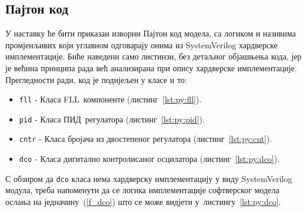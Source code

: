 \documentclass[master]{finthesis}
\newcommand*{\prog}[1]{\texttt{#1}}
\def \FLL  {FLL} %
\def \PID  {ПИД} %
\begin{document}
\subsection{Пајтон код} \label{section:python_model:source}
У наставку ће бити приказан изворни Пајтон код модела, са логиком и називима промјенљивих који углавном одговарају онима из SystemVerilog хардверске имплементације. Биће наведени само листинзи, без детаљног објашњења кода, јер је већина принципа рада већ анализирана при опису хардверске имплементације. Прегледности ради, код је подијељен у класе и то:
\begin{itemize}
	\item \prog{fll} - Класа \FLL\ компоненте (листинг~\ref{lst:py:fll}).
	\item \prog{pid} - Класа \PID\ регулатора (листинг~\ref{lst:py:pid}).
	\item \prog{cntr} - Класа бројача из двостепеног регулатора (листинг~\ref{lst:py:cnt}).
	\item \prog{dco} - Класа дигитално контролисаног осцилатора (листинг~\ref{lst:py:dco}).
\end{itemize}
С обзиром да \prog{dco} класа нема хардверску имплементацију у виду SystemVerilog модула, треба напоменути да се логика имплементације софтверског модела ослања на једначину~(\ref{f_dco}) што се може видјети у~листингу~\ref{lst:py:dco}.
\end{document}
